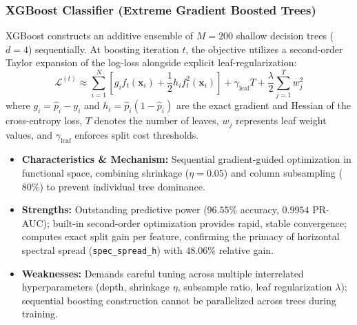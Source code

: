 \documentclass[11pt,a4paper]{article}
\begin{document}
\subsubsection{XGBoost Classifier (Extreme Gradient Boosted Trees)}
XGBoost constructs an additive ensemble of $M = 200$ shallow decision trees ($d = 4$) sequentially. At boosting iteration $t$, the objective utilizes a second-order Taylor expansion of the log-loss alongside explicit leaf-regularization:
\begin{equation*}
    \mathcal{L}^{(t)} \approx \sum_{i=1}^N \left[ g_i f_t(\mathbf{x}_i) + \frac{1}{2} h_i f_t^2(\mathbf{x}_i) \right] + \gamma_{\text{leaf}} T + \frac{\lambda}{2}\sum_{j=1}^T w_j^2
\end{equation*}
where $g_i = \hat{p}_i - y_i$ and $h_i = \hat{p}_i(1 - \hat{p}_i)$ are the exact gradient and Hessian of the cross-entropy loss, $T$ denotes the number of leaves, $w_j$ represents leaf weight values, and $\gamma_{\text{leaf}}$ enforces split cost thresholds.
\begin{itemize}\setlength{\itemsep}{1.5pt}\setlength{\parskip}{0pt}
    \item \textbf{Characteristics \& Mechanism:} Sequential gradient-guided optimization in functional space, combining shrinkage ($\eta = 0.05$) and column subsampling ($80\%$) to prevent individual tree dominance.
    \item \textbf{Strengths:} Outstanding predictive power ($96.55\%$ accuracy, $0.9954$ PR-AUC); built-in second-order optimization provides rapid, stable convergence; computes exact split gain per feature, confirming the primacy of horizontal spectral spread (\texttt{spec\_spread\_h}) with $48.06\%$ relative gain.
    \item \textbf{Weaknesses:} Demands careful tuning across multiple interrelated hyperparameters (depth, shrinkage $\eta$, subsample ratio, leaf regularization $\lambda$); sequential boosting construction cannot be parallelized across trees during training.
\end{itemize}
\end{document}
